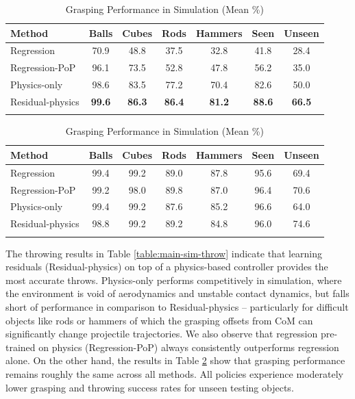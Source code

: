 \documentclass[journal]{IEEEtran}
\begin{document}
\begin{table}[h]
  \centering
  \setlength{\tabcolsep}{3.5 pt}
  \caption{Throwing Performance in Simulation (Mean \%)}
  \vspace{-0.5em}
  \begin{tabular}{lcccccc}
  \toprule
  Method & Balls & Cubes & Rods & Hammers & Seen & Unseen \\ 
  \midrule
  Regression       & 70.9 & 48.8 & 37.5 & 32.8 & 41.8 & 28.4 \\    
  Regression-PoP   & 96.1 & 73.5 & 52.8 & 47.8 & 56.2 & 35.0 \\   
  Physics-only     & 98.6 & 83.5 & 77.2 & 70.4 & 82.6 & 50.0 \\  
  Residual-physics & \bf{99.6} & \bf{86.3} & \bf{86.4} & \bf{81.2} & \bf{88.6} & \bf{66.5} \\  
  \bottomrule
  \label{table:main-sim-throw}
  \end{tabular}
  
  \centering
  \setlength{\tabcolsep}{3.5 pt}
  \caption{Grasping Performance in Simulation (Mean \%)}
  \vspace{-0.5em}
  \begin{tabular}{lcccccc}
  \toprule
  Method & Balls & Cubes & Rods & Hammers & Seen & Unseen \\
  \midrule
  Regression       & 99.4 & 99.2 & 89.0 & 87.8 & 95.6 & 69.4 \\  
  Regression-PoP   & 99.2 & 98.0 & 89.8 & 87.0 & 96.4 & 70.6 \\   
  Physics-only     & 99.4 & 99.2 & 87.6 & 85.2 & 96.6 & 64.0 \\    
  Residual-physics & 98.8 & 99.2 & 89.2 & 84.8 & 96.0 & 74.6 \\  
  \bottomrule
  \label{table:main-sim-grasp}
  \end{tabular}
  \vspace{-1em}
\end{table}

The throwing results in Table \ref{table:main-sim-throw} indicate that learning residuals (Residual-physics) on top of a physics-based controller provides the most accurate throws. Physics-only performs competitively in simulation, where the environment is void of aerodynamics and unstable contact dynamics, but falls short of performance in comparison to Residual-physics -- particularly for difficult objects like rods or hammers of which the grasping offsets from CoM can significantly change projectile trajectories. We also observe that regression pre-trained on physics (Regression-PoP) always consistently outperforms regression alone. On the other hand, the results in Table \ref{table:main-sim-grasp} show that grasping performance remains roughly the same across all methods. All policies experience moderately lower grasping and throwing success rates for unseen testing objects. 
\end{document}
